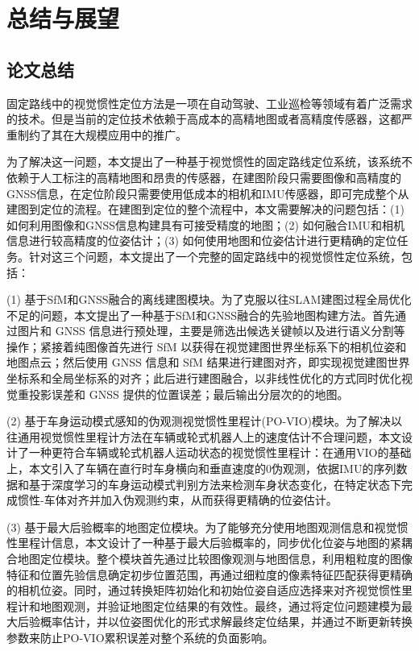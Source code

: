 \chapter{总结与展望}

\section{论文总结}

固定路线中的视觉惯性定位方法是一项在自动驾驶、工业巡检等领域有着广泛需求的技术。但是当前的定位技术依赖于高成本的高精地图或者高精度传感器，这都严重制约了其在大规模应用中的推广。

为了解决这一问题，本文提出了一种基于视觉惯性的固定路线定位系统，该系统不依赖于人工标注的高精地图和昂贵的传感器，在建图阶段只需要图像和高精度的GNSS信息，在定位阶段只需要使用低成本的相机和IMU传感器，即可完成整个从建图到定位的流程。在建图到定位的整个流程中，本文需要解决的问题包括：(1) 如何利用图像和GNSS信息构建具有可接受精度的地图；(2) 如何融合IMU和相机信息进行较高精度的位姿估计；(3) 如何使用地图和位姿估计进行更精确的定位任务。针对这三个问题，本文提出了一个完整的固定路线中的视觉惯性定位系统，包括：

(1) 基于SfM和GNSS融合的离线建图模块。为了克服以往SLAM建图过程全局优化不足的问题，本文提出了一种基于SfM和GNSS融合的先验地图构建方法。首先通过图片和 GNSS 信息进行预处理，主要是筛选出候选关键帧以及进行语义分割等操作；紧接着纯图像首先进行 SfM 以获得在视觉建图世界坐标系下的相机位姿和地图点云；然后使用 GNSS 信息和 SfM 结果进行建图对齐，即实现视觉建图世界坐标系和全局坐标系的对齐；此后进行建图融合，以非线性优化的方式同时优化视觉重投影误差和 GNSS 提供的位置误差；最后输出分层次的的地图。

(2) 基于车身运动模式感知的伪观测视觉惯性里程计(PO-VIO)模块。为了解决以往通用视觉惯性里程计方法在车辆或轮式机器人上的速度估计不合理问题，本文设计了一种更符合车辆或轮式机器人运动状态的视觉惯性里程计：在通用VIO的基础上，本文引入了车辆在直行时车身横向和垂直速度的0伪观测，依据IMU的序列数据和基于深度学习的车身运动模式判别方法来检测车身状态变化，在特定状态下完成惯性-车体对齐并加入伪观测约束，从而获得更精确的位姿估计。

(3) 基于最大后验概率的地图定位模块。为了能够充分使用地图观测信息和视觉惯性里程计信息，本文设计了一种基于最大后验概率的，同步优化位姿与地图的紧耦合地图定位模块。整个模块首先通过比较图像观测与地图信息，利用粗粒度的图像特征和位置先验信息确定初步位置范围，再通过细粒度的像素特征匹配获得更精确的相机位姿。同时，通过转换矩阵初始化和初始位姿自适应选择来对齐视觉惯性里程计和地图观测，并验证地图定位结果的有效性。最终，通过将定位问题建模为最大后验概率估计，并以位姿图优化的形式求解最终定位结果，并通过不断更新转换参数来防止PO-VIO累积误差对整个系统的负面影响。

